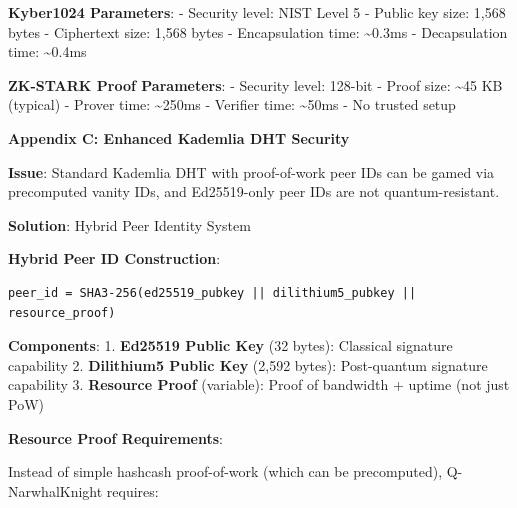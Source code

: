 \documentclass[
  11pt,
]{article}
\begin{document}
\textbf{Kyber1024 Parameters}: - Security level: NIST Level 5 - Public
key size: 1,568 bytes - Ciphertext size: 1,568 bytes - Encapsulation
time: \textasciitilde0.3ms - Decapsulation time: \textasciitilde0.4ms

\textbf{ZK-STARK Proof Parameters}: - Security level: 128-bit - Proof
size: \textasciitilde45 KB (typical) - Prover time: \textasciitilde250ms
- Verifier time: \textasciitilde50ms - No trusted setup

\textbf{Appendix C: Enhanced Kademlia DHT Security}

\textbf{Issue}: Standard Kademlia DHT with proof-of-work peer IDs can be
gamed via precomputed vanity IDs, and Ed25519-only peer IDs are not
quantum-resistant.

\textbf{Solution}: Hybrid Peer Identity System

\textbf{Hybrid Peer ID Construction}:

\begin{verbatim}
peer_id = SHA3-256(ed25519_pubkey || dilithium5_pubkey || resource_proof)
\end{verbatim}

\textbf{Components}: 1. \textbf{Ed25519 Public Key} (32 bytes):
Classical signature capability 2. \textbf{Dilithium5 Public Key} (2,592
bytes): Post-quantum signature capability 3. \textbf{Resource Proof}
(variable): Proof of bandwidth + uptime (not just PoW)

\textbf{Resource Proof Requirements}:

Instead of simple hashcash proof-of-work (which can be precomputed),
Q-NarwhalKnight requires:
\end{document}
